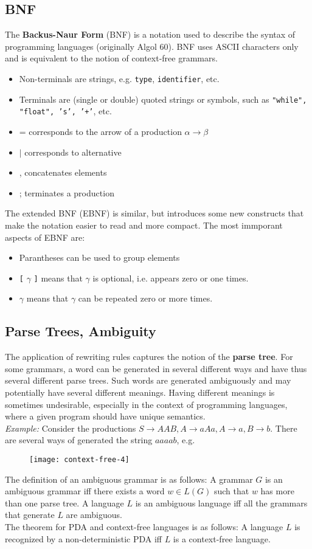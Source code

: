 \subsection{BNF}
The \textbf{Backus-Naur Form} (BNF) is a notation used to describe 
the syntax of programming languages (originally Algol 60). BNF uses ASCII
characters only and is equivalent to the notion of context-free grammars.
\begin{itemize}
  \item Non-terminals are strings, e.g. \texttt{type}, \texttt{identifier}, etc.
  \item Terminals are (single or double) quoted strings or symbols, such as \texttt{"while", "float", 's', '+'}, etc.
  \item = corresponds to the arrow of a production $\alpha \rightarrow \beta$
  \item $\mid$ corresponds to alternative
  \item , concatenates elements
  \item ; terminates a production
\end{itemize}
The extended BNF (EBNF) is similar, but introduces some new constructs 
that make the notation easier to read and more compact. The most immporant aspects of EBNF are:
\begin{itemize}
  \item Parantheses can be used to group elements
  \item \texttt{[} $\gamma$ \texttt{]} means that $\gamma$ is optional, i.e. appears zero or one times.
  \item \texttt{\textbraceleft} $\gamma$ \texttt{\textbraceright} means that $\gamma$ can be repeated zero or more times.
\end{itemize}

\subsection{Parse Trees, Ambiguity}
The application of rewriting rules captures the notion of the \textbf{parse tree}.
For some grammars, a word can be generated in several different ways and have thus 
several different parse trees. Such words are generated ambiguously and may potentially 
have several different meanings.
Having different meanings is sometimes undesirable, especially in the context of programming languages,
where a given program should have unique semantics.\\

\textit{Example: } Consider the productions $S \rightarrow AAB, A \rightarrow aAa, A \rightarrow a,
B \rightarrow b$. There are several ways of generated the string $aaaab$, e.g.
\begin{figure}[H]
  \centering
  \texttt{[image: context-free-4]}
\end{figure}
The definition of an ambiguous grammar is as follows:
A grammar $G$ is an ambiguous grammar iff there exists a word  
$w \in L(G)$ such that $w$ has more than one parse tree.
A language $L$ is an ambiguous language iff all the grammars that generate $L$ are ambiguous.\\

The theorem for PDA and context-free languages is as follows:
A language $L$ is recognized by a non-deterministic PDA iff $L$ is a context-free language.